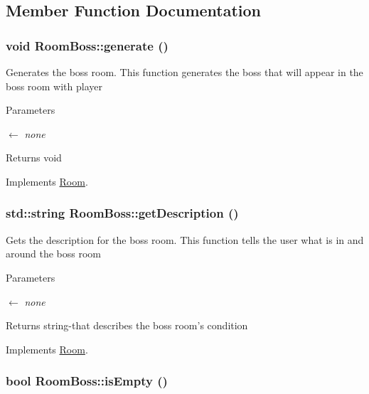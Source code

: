 \subsection{Member Function Documentation}
\hypertarget{classRoomBoss_a89ec3d9b6046f70dca3f802f0eed8694}{
\subsubsection[{generate}]{\setlength{\rightskip}{0pt plus 5cm}void RoomBoss::generate ()}}
\label{classRoomBoss_a89ec3d9b6046f70dca3f802f0eed8694}


Generates the boss room. This function generates the boss that will appear in the boss room with player 
\begin{DoxyParams}{Parameters}
\item[\mbox{$\leftarrow$} {\em none}]\end{DoxyParams}
\begin{DoxyReturn}{Returns}
void 
\end{DoxyReturn}


Implements \hyperlink{classRoom_a3556128b8e7f544fa618576fbab4b52e}{Room}.\hypertarget{classRoomBoss_acd5c1cfde60b2865189c40839d5625f0}{
\subsubsection[{getDescription}]{\setlength{\rightskip}{0pt plus 5cm}std::string RoomBoss::getDescription ()}}
\label{classRoomBoss_acd5c1cfde60b2865189c40839d5625f0}


Gets the description for the boss room. This function tells the user what is in and around the boss room 
\begin{DoxyParams}{Parameters}
\item[\mbox{$\leftarrow$} {\em none}]\end{DoxyParams}
\begin{DoxyReturn}{Returns}
string-\/that describes the boss room's condition 
\end{DoxyReturn}


Implements \hyperlink{classRoom_aacf839325fa7c6b08d21533b0780025c}{Room}.\hypertarget{classRoomBoss_a15ab5fc9402dad03aea7fa32c1ed3d2a}{
\subsubsection[{isEmpty}]{\setlength{\rightskip}{0pt plus 5cm}bool RoomBoss::isEmpty ()}}
\label{classRoomBoss_a15ab5fc9402dad03aea7fa32c1ed3d2a}


